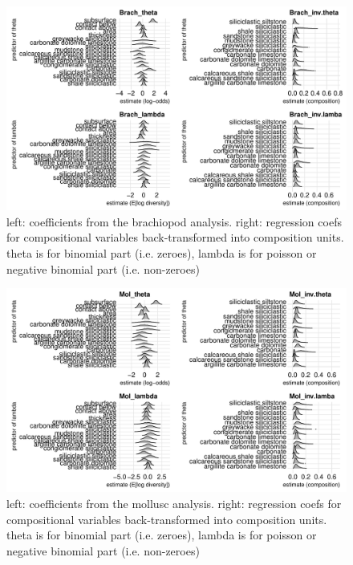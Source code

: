 \documentclass[12pt,letterpaper]{article}
\begin{document}
\afterpage{\clearpage}
\begin{figure}[h]
  \centering
  \includegraphics[width=\textwidth,height=0.8\textheight,keepaspectratio=true]{figure/brach_coefs}
  \caption{left: coefficients from the brachiopod analysis. right: regression coefs for compositional variables back-transformed into composition units. theta is for binomial part (i.e. zeroes), lambda is for poisson or negative binomial part (i.e. non-zeroes)}
  \label{fig:brach_coefs}
\end{figure}

\afterpage{\clearpage}
\begin{figure}[h]
  \centering
  \includegraphics[width=\textwidth,height=0.8\textheight,keepaspectratio=true]{figure/mol_coefs}
  \caption{left: coefficients from the mollusc analysis. right: regression coefs for compositional variables back-transformed into composition units. theta is for binomial part (i.e. zeroes), lambda is for poisson or negative binomial part (i.e. non-zeroes)}
  \label{fig:mol_coefs}
\end{figure}
\end{document}
